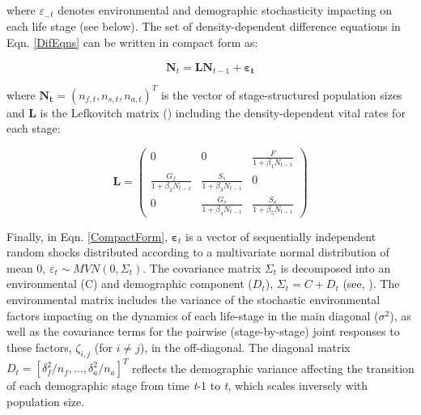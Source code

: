 \documentclass[12pt]{article}
\begin{document}
where $\varepsilon_{.,t}$ denotes environmental and demographic stochasticity impacting on each life stage (see below). The set of density-dependent difference equations in Eqn. \ref{DifEqns} can be written in compact form as:

\begin{equation}\label{CompactForm}
	\mathbf{N}_{t}=\mathbf{L} \mathbf{N}_{t-1} + \boldsymbol{\varepsilon_{t}}
\end{equation}

where $\mathbf{N_{t}} = (n_{f,t}, n_{s,t}, n_{a,t})^T$ is the vector of stage-structured population sizes and $\mathbf{L}$ is the Lefkovitch matrix (\cite{Lefkovitch1965}) including the density-dependent vital rates for each stage:

\begin{equation}\label{DDLefkovitchMatrix}
	\mathbf{L}=\left(\begin{array}{ccc}{0} & {0} & {\frac{F}{1+\beta_{1} N_{ t-1}}} \\
		{\frac{G_{f}}{1+\beta_{2} N_{ t-1}}} & {\frac{S_{s}}{1+\beta_{3} N_{ t-1}}} & {0} \\
		{0} & {\frac{G_{s}}{1+\beta_{4} N_{ t-1}}} & {\frac{S_{a}}{1+\beta_{5} N_{ t-1}}}\end{array}\right)
\end{equation}


Finally, in Eqn. \ref{CompactForm}, $\boldsymbol\varepsilon_{t}$ is a vector of sequentially independent random shocks distributed according to a multivariate normal distribution of mean 0, $\varepsilon_{t} \sim MVN(0, \Sigma_{t})$. The covariance matrix $\Sigma_{t}$ is decomposed into an environmental (C) and demographic component ($D_{t}$), $\Sigma_{t} = C + D_{t}$ (see, \cite{Mutshinda2011,Almaraz2011}). The environmental matrix includes the variance of the stochastic environmental factors impacting on the dynamics of each life-stage in the main diagonal ($\sigma^2$), as well as the covariance terms for the pairwise (stage-by-stage) joint responses to these factors, $\zeta_{i,j}$ (for $i \neq j$), in the off-diagonal. The diagonal matrix $D_{t} = [\delta_{f}^2/n_{f},\ldots, \delta_{a}^2/n_{a}]^T$ reflects the demographic variance affecting the transition of each demographic stage from time \textit{t}-1 to \textit{t}, which scales inversely with population size.\\
\end{document}

